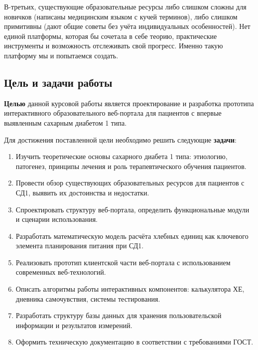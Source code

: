 \documentclass[14pt, a4paper]{extarticle}
\begin{document}
\medskip
\noindent В-третьих, существующие образовательные ресурсы либо слишком сложны для новичков (написаны медицинским языком с кучей терминов), либо слишком примитивны (дают общие советы без учёта индивидуальных особенностей). Нет единой платформы, которая бы сочетала в себе теорию, практические инструменты и возможность отслеживать свой прогресс. Именно такую платформу мы и попытаемся создать.

\subsection*{Цель и задачи работы}

\noindent \textbf{Целью} данной курсовой работы является проектирование и разработка прототипа интерактивного образовательного веб-портала для пациентов с впервые выявленным сахарным диабетом 1 типа.

\medskip
\noindent Для достижения поставленной цели необходимо решить следующие \textbf{задачи}:

\begin{enumerate}
\item Изучить теоретические основы сахарного диабета 1 типа: этиологию, патогенез, принципы лечения и роль терапевтического обучения пациентов.

\item Провести обзор существующих образовательных ресурсов для пациентов с СД1, выявить их достоинства и недостатки.

\item Спроектировать структуру веб-портала, определить функциональные модули и сценарии использования.

\item Разработать математическую модель расчёта хлебных единиц как ключевого элемента планирования питания при СД1.

\item Реализовать прототип клиентской части веб-портала с использованием современных веб-технологий.

\item Описать алгоритмы работы интерактивных компонентов: калькулятора ХЕ, дневника самочувствия, системы тестирования.

\item Разработать структуру базы данных для хранения пользовательской информации и результатов измерений.

\item Оформить техническую документацию в соответствии с требованиями ГОСТ.
\end{enumerate}
\end{document}
